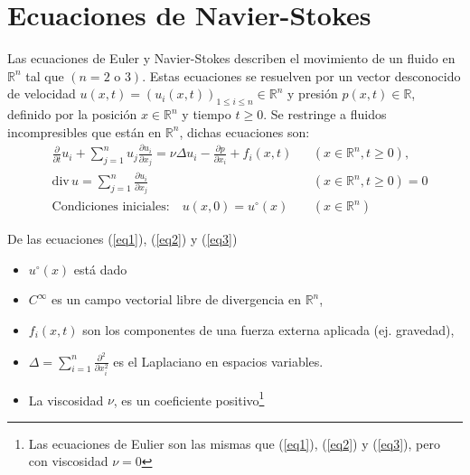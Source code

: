 \section{Ecuaciones de Navier-Stokes}
Las ecuaciones de Euler y Navier-Stokes describen el movimiento de un fluido en $\mathbb{R}^n$ tal que $(n=2\text{ o }3)$. Estas ecuaciones se resuelven por un vector desconocido de velocidad $u(x,t)= \left(u_i(x,t)\right)_{1\leq i \leq n}\in \mathbb{R}^n$ y presión $p(x,t)\in \mathbb{R}$, definido por la posición $x\in \mathbb{R}^n$ y tiempo $t\geq 0$. Se restringe a fluidos incompresibles que están en $\mathbb{R}^n$, dichas ecuaciones son:
\begin{align}
    &\frac{\partial}{\partial t} u_i + \sum_{j = 1}^n u_j \frac{\partial u_i}{\partial x_j} = \nu \Delta u_i - \frac{\partial p}{\partial x_i} + f_i(x,t)&& \left(x\in \mathbb{R}^n, t\geq 0\right),\label{eq1}\\
    &\text{div}\, u = \sum_{j = 1}^n \frac{\partial u_i}{\partial x_j} && \left(x\in \mathbb{R}^n, t\geq 0\right) =0\label{eq2}\\
    &\text{Condiciones iniciales:}\quad u(x,0) = u^{\circ}(x) && \left(x\in \mathbb{R}^n\right)\label{eq3}
\end{align}
\begin{notation}
De las ecuaciones (\ref{eq1}), (\ref{eq2}) y (\ref{eq3})
    \begin{itemize}
        \item $u^{\circ}(x)$ está dado
        \item $C^{\infty}$  es un campo vectorial libre de divergencia en $\mathbb{R}^n$,
        \item $f_i(x,t)$ son los componentes de una fuerza externa aplicada (ej. gravedad),
        \item $\Delta = \sum_{i=1}^n \frac{\partial^2}{\partial x_i^2}$ es el Laplaciano en espacios variables.
        \item La viscosidad $\nu$, es un coeficiente positivo\footnote{Las ecuaciones de Eulier son las mismas que (\ref{eq1}), (\ref{eq2}) y (\ref{eq3}), pero con viscosidad $\nu=0$}
    \end{itemize}    
\end{notation}
